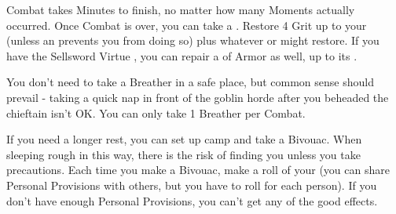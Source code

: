 

  Combat takes Minutes to finish, no matter how many Moments actually occurred.  Once Combat is over, you can take a .  Restore 4 Grit up to your \MAX (unless an  prevents you from doing so) plus whatever  or  might restore.  If you have the Sellsword Virtue , you can repair a \UD of Armor as well, up to its \MAX.

  You don't need to take a Breather in a safe place, but common sense should prevail - taking a quick nap in front of the goblin horde after you beheaded the chieftain isn't OK.  You can only take 1 Breather per Combat.



  If you need a longer rest, you can set up camp and take a Bivouac. When sleeping rough in this way, there is the risk of  finding you unless you take precautions. Each time you make a Bivouac, make a \UD roll of your  (you can share Personal Provisions with others, but you have to roll for each person).  If you don't have enough Personal Provisions, you can't get any of the good effects. 



  \cbreak\bump


